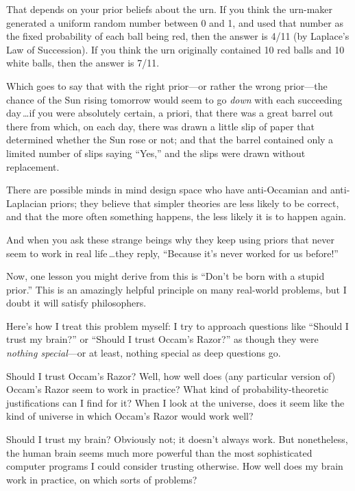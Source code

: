  That depends on your prior beliefs about the urn. If you think the
urn-maker generated a uniform random number between 0 and 1, and used
that number as the fixed probability of each ball being red, then the
answer is 4/11 (by Laplace's Law of Succession). If you
think the urn originally contained 10 red balls and 10 white balls,
then the answer is 7/11.


 Which goes to say that with the right prior---or rather the wrong
prior---the chance of the Sun rising tomorrow would seem to go
\textit{down} with each succeeding day\,\ldots if you were absolutely
certain, a priori, that there was a great barrel out there from which,
on each day, there was drawn a little slip of paper that determined
whether the Sun rose or not; and that the barrel contained only a
limited number of slips saying
``Yes,'' and the slips were drawn
without replacement.


 There are possible minds in mind design space who have
anti-Occamian and anti-Laplacian priors; they believe that simpler
theories are less likely to be correct, and that the more often
something happens, the less likely it is to happen again.


 And when you ask these strange beings why they keep using priors
that never seem to work in real life\,\ldots they reply,
``Because it's never worked for us
before!''


 Now, one lesson you might derive from this is
``Don't be born with a stupid
prior.'' This is an amazingly helpful principle on
many real-world problems, but I doubt it will satisfy philosophers.


 Here's how I treat this problem myself: I try to
approach questions like ``Should I trust my
brain?'' or ``Should I trust
Occam's Razor?'' as though they were
\textit{nothing special}{}---or at least, nothing special as deep
questions go.


 Should I trust Occam's Razor? Well, how well does
(any particular version of) Occam's Razor seem to work
in practice? What kind of probability-theoretic justifications can I
find for it? When I look at the universe, does it seem like the kind of
universe in which Occam's Razor would work well?


 Should I trust my brain? Obviously not; it doesn't
always work. But nonetheless, the human brain seems much more powerful
than the most sophisticated computer programs I could consider trusting
otherwise. How well does my brain work in practice, on which sorts of
problems?


